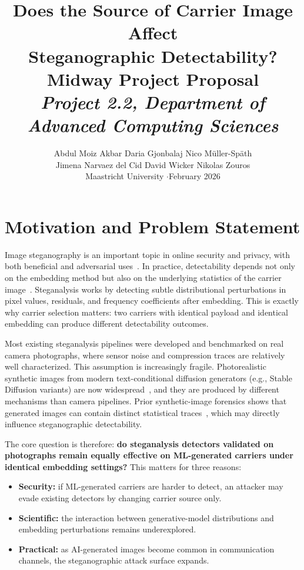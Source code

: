 \documentclass[10pt,twocolumn,a4paper]{article}
\title{\vspace{-1.2cm}\textbf{Does the Source of Carrier Image Affect\\
Steganographic Detectability?}\\[4pt]
\large Midway Project Proposal\\[6pt]
\normalsize\textit{Project 2.2, Department of Advanced Computing Sciences}}
\author{Abdul Moiz Akbar \quad Daria Gjonbalaj \quad Nico Müller-Späth\\[2pt]
Jimena Narvaez del Cid \quad David Wicker \quad Nikolas Zouros\\[2pt]
\small Maastricht University \quad$\cdot$\quad February 2026}
\date{}
\begin{document}
\maketitle
\thispagestyle{fancy}
\vspace{-0.6cm}

\section{Motivation and Problem Statement}

Image steganography is an important topic in online security and privacy, with both beneficial and adversarial uses~\cite{petitcolas1999,cheddad2010,provos2003f5}. In practice, detectability depends not only on the embedding method but also on the underlying statistics of the carrier image~\cite{hussain2018,fridrich2012srm}. Steganalysis works by detecting subtle distributional perturbations in pixel values, residuals, and frequency coefficients after embedding. This is exactly why carrier selection matters: two carriers with identical payload and identical embedding can produce different detectability outcomes.

Most existing steganalysis pipelines were developed and benchmarked on real camera photographs, where sensor noise and compression traces are relatively well characterized. This assumption is increasingly fragile. Photorealistic synthetic images from modern text-conditional diffusion generators (e.g., Stable Diffusion variants) are now widespread~\cite{rombach2022sd}, and they are produced by different mechanisms than camera pipelines. Prior synthetic-image forensics shows that generated images can contain distinct statistical traces~\cite{wang2020cnn,corvi2023diffusion}, which may directly influence steganographic detectability.

The core question is therefore: \textbf{do steganalysis detectors validated on photographs remain equally effective on ML-generated carriers under identical embedding settings?} This matters for three reasons:
\begin{itemize}
\item \textbf{Security:} if ML-generated carriers are harder to detect, an attacker may evade existing detectors by changing carrier source only.
\item \textbf{Scientific:} the interaction between generative-model distributions and embedding perturbations remains underexplored.
\item \textbf{Practical:} as AI-generated images become common in communication channels, the steganographic attack surface expands.
\end{itemize}
\end{document}
